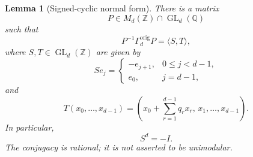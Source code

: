 \documentclass[a4paper,11pt]{amsart}
\newcommand{\Z}{\mathbb Z}
\newcommand{\Q}{\mathbb Q}
\newcommand{\GL}{\operatorname{GL}}
\newtheorem{lemma}[theorem]{Lemma}
\theoremstyle{remark}
\numberwithin{equation}{section}
\begin{document}
\begin{lemma}[Signed-cyclic normal form]\label{lem:normal-form}
There is a matrix
\[
P\in M_d(\Z)\cap \GL_d(\Q)
\]
such that
\[
P^{-1}\Gamma_d^{\mathrm{orig}}P=\langle S,T\rangle,
\]
where \(S,T\in\GL_d(\Z)\) are given by
\begin{equation}\label{eq:Saction}
Se_j=
\begin{cases}
-e_{j+1},&0\leq j<d-1,\\
e_0,&j=d-1,
\end{cases}
\end{equation}
and
\begin{equation}\label{eq:Taction}
T(x_0,\ldots,x_{d-1})
=
\left(
x_0+\sum_{r=1}^{d-1}q_rx_r,\,
x_1,\ldots,x_{d-1}
\right).
\end{equation}
In particular,
\[
S^d=-I.
\]
The conjugacy is rational; it is not asserted to be unimodular.
\end{lemma}
\end{document}
